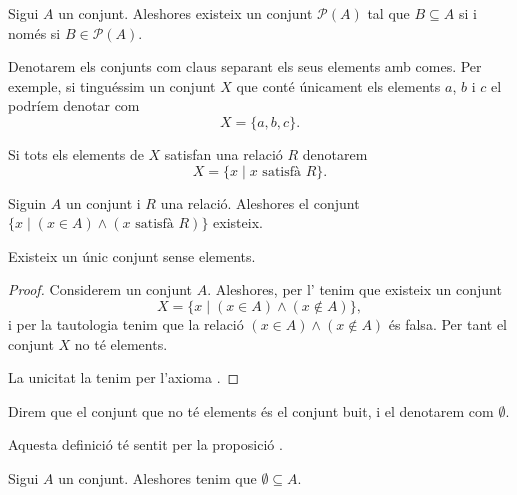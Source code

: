 \documentclass[../Apunts.tex]{subfiles}
\begin{document}
	\begin{axiom}
		Sigui \(A\) un conjunt. Aleshores existeix un conjunt \(\mathcal{P}(A)\) tal que \(B\subseteq A\) si i només si \(B\in\mathcal{P}(A)\).
	\end{axiom}
	\begin{notation}
		Denotarem els conjunts com claus separant els seus elements amb comes. Per exemple, si tinguéssim un conjunt \(X\) que conté únicament els elements \(a\), \(b\) i \(c\) el podríem denotar com
		\[X=\{a,b,c\}.\]
		
		Si tots els elements de \(X\) satisfan una relació \(R\) denotarem
		\[X=\{x\mid x\text{ satisfà }R\}.\]
	\end{notation}
	\begin{axiom}
		\label{axiom:axioma de separació}
		Siguin \(A\) un conjunt i \(R\) una relació. Aleshores el conjunt \(\{x\mid(x\in A)\land(x\text{ satisfà }R)\}\) existeix.
	\end{axiom}
	\begin{proposition}
		\label{prop:conjunt buit}
		Existeix un únic conjunt sense elements.
		\begin{proof}
			Considerem un conjunt \(A\). Aleshores, per l' tenim que existeix un conjunt
			\[X=\{x\mid(x\in A)\land(x\notin A)\},\]
			i per la tautologia  tenim que la relació \((x\in A)\land(x\notin A)\) és falsa. Per tant el conjunt \(X\) no té elements.
			
			La unicitat la tenim per l'axioma .
		\end{proof}
	\end{proposition}
	\begin{definition}
		Direm que el conjunt que no té elements és el conjunt buit, i el denotarem com \(\emptyset\).
		
		Aquesta definició té sentit per la proposició .
	\end{definition}
	\begin{axiom}
		Sigui \(A\) un conjunt. Aleshores tenim que \(\emptyset\subseteq A\).
	\end{axiom}
\end{document}
